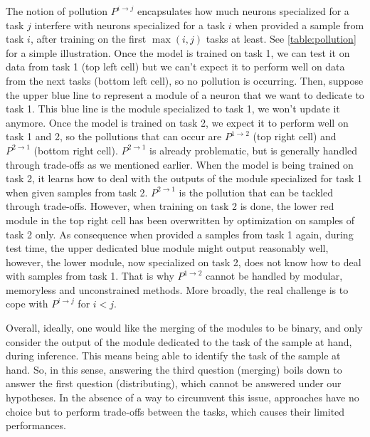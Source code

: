 \documentclass[11pt]{article}
\begin{document}
\vspace{2mm}
\noindent
The notion of pollution $P^{i\rightarrow j}$ encapsulates how much neurons specialized for a task $j$ interfere with neurons specialized for a task $i$ when provided a sample from task $i$, after training on the first $\max(i,j)$ tasks at least. See \ref{table:pollution} for a simple illustration. Once the model is trained on task 1, we can test it on data from task 1 (top left cell) but we can't expect it to perform well on data from the next tasks (bottom left cell), so no pollution is occurring. Then, suppose the upper blue line to represent a module of a neuron that we want to dedicate to task 1. This blue line is the module specialized to task 1, we won't update it anymore. Once the model is trained on task 2, we expect it to perform well on task 1 and 2, so the pollutions that can occur are $P^{1\rightarrow 2}$ (top right cell) and $P^{2\rightarrow 1}$ (bottom right cell). $P^{2\rightarrow 1}$ is already problematic, but is generally handled through trade-offs as we mentioned earlier. When the model is being trained on task 2, it learns how to deal with the outputs of the module specialized for task 1 when given samples from task 2. $P^{2\rightarrow 1}$ is the pollution that can be tackled through trade-offs. However, when training on task 2 is done, the lower red module in the top right cell has been overwritten by optimization on samples of task 2 only. As consequence when provided a samples from task 1 again, during test time, the upper dedicated blue module might output reasonably well, however, the lower module, now specialized on task 2, does not know how to deal with samples from task 1. That is why $P^{1\rightarrow 2}$ cannot be handled by modular, memoryless and unconstrained methods. More broadly, the real challenge is to cope with $P^{i\rightarrow j}$ for $i<j$.

\vspace{2mm}
\noindent
Overall, ideally, one would like the merging of the modules to be binary, and only consider the output of the module dedicated to the task of the sample at hand, during inference. This means being able to identify the task of the sample at hand. So, in this sense, answering the third question (merging) boils down to answer the first question (distributing), which cannot be answered under our hypotheses. In the absence of a way to circumvent this issue, approaches have no choice but to perform trade-offs between the tasks, which causes their limited performances.
\end{document}
